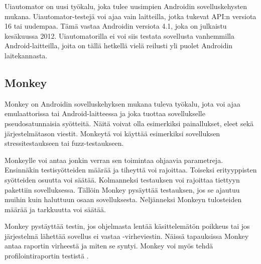 Uiautomator on uusi työkalu, joka tulee uusimpien Androidin sovelluskehysten mukana. Uiautomator-testejä voi ajaa vain laitteilla, jotka tukevat API:n versiota 16 tai uudempaa. Tämä vastaa Androidin versiota 4.1, joka on julkaistu kesäkuussa 2012. Uiautomatorilla ei voi siis testata sovellusta vanhemmilla Android-laitteilla, joita on tällä hetkellä vielä reilusti yli puolet Androidin laitekannasta.

\subsection{Monkey}

Monkey \cite{monkey} on Androidin sovelluskehyksen mukana tuleva työkalu, jota voi ajaa emulaattorissa tai Android-laitteessa ja joka tuottaa sovellukselle pseudosatunnaisia syötteitä. Näitä voivat olla esimerkiksi painallukset, eleet sekä järjestelmätason viestit. Monkeytä voi käyttää esimerkiksi sovelluksen stressitestaukseen tai fuzz-testaukseen.

Monkeylle voi antaa jonkin verran sen toimintaa ohjaavia parametreja. Ensinnäkin testisyötteiden määrää ja tiheyttä voi rajoittaa. Toiseksi erityyppisten syötteiden osuutta voi säätää. Kolmanneksi testauksen voi rajoittaa tiettyyn pakettiin sovelluksessa. Tällöin Monkey pysäyttää testauksen, jos se ajautuu muihin kuin haluttuun osaan sovelluksesta. Neljänneksi Monkeyn tulosteiden määrää ja tarkkuutta voi säätää.

Monkey pystäyttää testin, jos ohjelmasta lentää käsittelemätön poikkeus tai jos järjestelmä lähettää sovellus ei vastaa -virheviestin. Näissä tapauksissa Monkey antaa raportin virheestä ja miten se syntyi. Monkey voi myös tehdä profilointiraportin testistä .